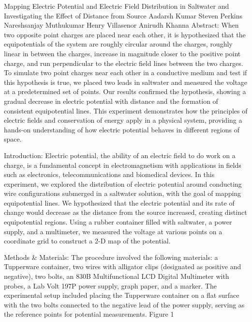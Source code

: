 ﻿Mapping Electric Potential and Electric Field Distribution in Saltwater and Investigating the Effect of Distance from Source
Aadarsh Kumar    Steven Perkins    Nareshsanjay Muthukumar    
Henry Villasenor    Anirudh Khanna
Abstract: 
When two opposite point charges are placed near each other, it is hypothesized that the equipotentials of the system are roughly circular around the charges, roughly linear in between the charges, increase in magnitude closer to the positive point charge, and run perpendicular to the electric field lines between the two charges. To simulate two point charges near each other in a conductive medium and test if this hypothesis is true, we placed two leads in saltwater and measured the voltage at a predetermined set of points. Our results confirmed the hypothesis, showing a gradual decrease in electric potential with distance and the formation of consistent equipotential lines. This experiment demonstrates how the principles of electric fields and conservation of energy apply in a physical system, providing a hands-on understanding of how electric potential behaves in different regions of space.


Introduction:
        Electric potential, the ability of an electric field to do work on a charge, is a fundamental concept in electromagnetism with applications in fields such as electronics, telecommunications and biomedical devices. In this experiment, we explored the distribution of electric potential around conducting wire configurations submerged in a saltwater solution, with the goal of mapping equipotential lines. We hypothesized that the electric potential and its rate of change would decrease as the distance from the source increased, creating distinct equipotential regions. Using a rubber container filled with saltwater, a power supply, and a multimeter, we measured the voltage at various points on a coordinate grid to construct a 2-D map of the potential.
 
Methods & Materials:
        The procedure involved the following materials: a Tupperware container, two wires with alligator clips (designated as positive and negative), two bolts, an 830B Multifunctional LCD Digital Multimeter with probes, a Lab Volt 197P power supply, graph paper, and a marker. The experimental setup included placing the Tupperware container on a flat surface with the two bolts connected to the negative lead of the power supply, serving as the reference points for potential measurements.                           Figure 1  








